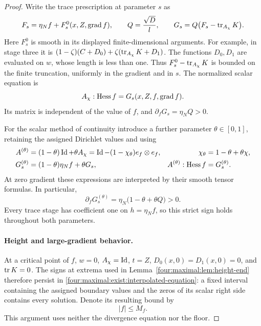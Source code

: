 \begin{proof}
Write the trace prescription at parameter $s$ as
\[
 F_s=\eta_N f+F_s^0(x,Z,\operatorname{grad} f),\qquad
 Q=\frac{\sqrt D}{l},\qquad
 G_s=Q\bigl(F_s-\operatorname{tr}_{A_\chi}K\bigr).
\]
Here $F_s^0$ is smooth in its displayed finite-dimensional arguments.
For example, in stage three it is
$(1-\zeta)(C+D_0)+\zeta(\operatorname{tr}_{A_\chi}K+D_1)$.
The functions $D_0,D_1$ are evaluated on $w$, whose length is less than
one.  Thus $F_s^0-\operatorname{tr}_{A_\chi}K$ is bounded on the finite truncation,
uniformly in the gradient and in $s$.  The normalized scalar equation is
\begin{equation}\label{four:maximal:exist:normalized-trace}
 A_\chi:\operatorname{Hess} f=G_s(x,Z,f,\operatorname{grad} f).
\end{equation}
Its matrix is independent of the value of $f$, and
$\partial_fG_s=\eta_N Q>0$.

For the scalar method of continuity introduce a further parameter
$\theta\in[0,1]$, retaining the assigned Dirichlet values and using
\begin{align}
 A^{(\theta)}&=(1-\theta)\operatorname{Id}+\theta A_\chi
       =\operatorname{Id}-(1-\chi_\theta)e_f\otimes e_f,
       &\chi_\theta&=1-\theta+\theta\chi,\label{four:maximal:exist:scalar-interpolation}\\
 G_s^{(\theta)}&=(1-\theta)\eta_N f+\theta G_s,
       &A^{(\theta)}:\operatorname{Hess} f&=G_s^{(\theta)}.
       \label{four:maximal:exist:interpolated-equation}
\end{align}
At zero gradient these expressions are interpreted by their smooth
tensor formulas.  In particular,
\begin{equation}\label{four:maximal:exist:strict-height}
 \partial_fG_s^{(\theta)}
       =\eta_N\bigl(1-\theta+\theta Q\bigr)>0.
\end{equation}
Every trace stage has coefficient one on $h=\eta_N f$, so this strict
sign holds throughout both parameters.

\paragraph{Height and large-gradient behavior.}
At a critical point of $f$, $w=0$, $A_\chi=\operatorname{Id}$, $t=Z$,
$D_0(x,0)=D_1(x,0)=0$, and $\operatorname{tr} K=0$.
The signs at extrema used in Lemma~\ref{four:maximal:lem:height-end} therefore
persist in \eqref{four:maximal:exist:interpolated-equation}: a fixed interval
containing the assigned boundary values and the zeros of its scalar
right side contains every solution.  Denote its resulting bound by
\begin{equation}\label{four:maximal:exist:scalar-height}
 |f|\le M_f.
\end{equation}
This argument uses neither the divergence equation nor the floor.


\end{proof}
